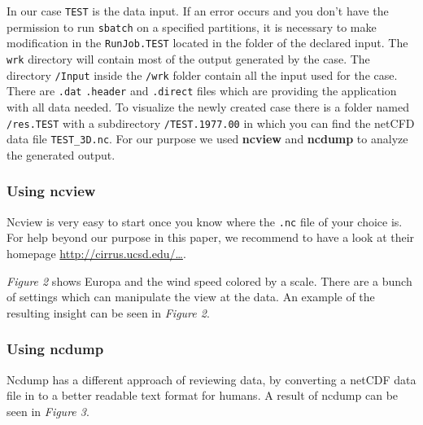 \documentclass[]{article}
\begin{document}
In our case \texttt{TEST} is the data input. If an error occurs and you
don't have the permission to run \texttt{sbatch} on a specified
partitions, it is necessary to make modification in the
\texttt{RunJob.TEST} located in the folder of the declared input. The
\texttt{wrk} directory will contain most of the output generated by the
case. The directory \texttt{/Input} inside the \texttt{/wrk} folder
contain all the input used for the case. There are \texttt{.dat}
\texttt{.header} and \texttt{.direct} files which are providing the
application with all data needed. To visualize the newly created case
there is a folder named \texttt{/res.TEST} with a subdirectory
\texttt{/TEST.1977.00} in which you can find the netCFD data file
\texttt{TEST\_3D.nc}. For our purpose we used \textbf{ncview} and
\textbf{ncdump} to analyze the generated output.

\subsubsection{Using ncview}\label{using-ncview}

Ncview is very easy to start once you know where the \texttt{.nc} file
of your choice is. For help beyond our purpose in this paper, we
recommend to have a look at their homepage
\href{http://cirrus.ucsd.edu/~pierce/software/ncview/index.html}{http://cirrus.ucsd.edu/\ldots{}}.

\emph{Figure 2} shows Europa and the wind speed colored by a scale.
There are a bunch of settings which can manipulate the view at the data.
An example of the resulting insight can be seen in \emph{Figure 2}.

\subsubsection{Using ncdump}\label{using-ncdump}

Ncdump has a different approach of reviewing data, by converting a
netCDF data file in to a better readable text format for humans. A
result of ncdump can be seen in \emph{Figure 3}.

\begin{eqnarray*}
\text{\phantom{'test'}}
\end{eqnarray*}

\begin{eqnarray*}
\text{\phantom{'test'}}
\end{eqnarray*}

\begin{eqnarray*}
\text{\phantom{'test'}}
\end{eqnarray*}
\end{document}
